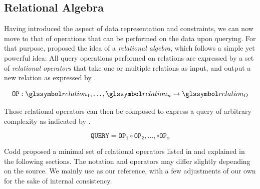 \subsection{Relational Algebra}
\label{section:rel_algebra}

Having introduced the aspect of data representation and constraints, we can now move to that of operations that can be performed on the data upon querying. For that purpose, \cite{Codd:1970Relational} proposed the idea of a \emph{relational algebra}, which follows a simple yet powerful idea: All query operations performed on relations are expressed by a set of \emph{relational operators} that take one or multiple relations as input, and output a new relation as expressed by .

\begin{equation}
    \label{equation:rel_op}
    \mathtt{OP}: \relation_1, \ldots, \relation_n \rightarrow \relation_{O}
\end{equation}

Those relational operators can then be composed to express a query of arbitrary complexity as indicated by .

\begin{equation}
    \label{equation:rel_query}
    \mathtt{QUERY} = \mathtt{OP_{1}} \circ \mathtt{OP_{2}}, \ldots , \circ \mathtt{OP_{m}}
\end{equation}

Codd proposed a minimal set of relational operators listed in  and explained in the following sections. The notation and operators may differ slightly depending on the source. We mainly use \cite{Garcia:2009Database} as our reference, with a few adjustments of our own for the sake of internal consistency.

